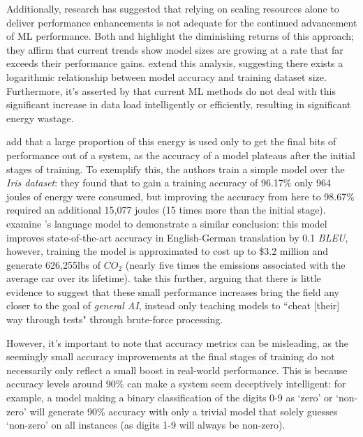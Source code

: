 \documentclass[a4paper, 12pt]{article}
\begin{document}
    Additionally, research has suggested that relying on scaling resources alone to deliver performance enhancements is not adequate for the continued advancement of ML performance. Both  and  highlight the diminishing returns of this approach; they affirm that current trends show model sizes are growing at a rate that far exceeds their performance gains.  extend this analysis, suggesting there exists a logarithmic relationship between model accuracy and training dataset size. Furthermore, it's asserted by  that current ML methods do not deal with this significant increase in data load intelligently or efficiently, resulting in significant energy wastage.

     add that a large proportion of this energy is used only to get the final bits of performance out of a system, as the accuracy of a model plateaus after the initial stages of training. To exemplify this, the authors train a simple model over the \emph{Iris dataset}: they found that to gain a training accuracy of 96.17\% only 964 joules of energy were consumed, but improving the accuracy from here to 98.67\% required an additional 15,077 joules (15 times more than the initial stage).  examine 's language model to demonstrate a similar conclusion: this model improves state-of-the-art accuracy in English-German translation by 0.1 \emph{BLEU}, however, training the model is approximated to cost up to \$3.2 million and generate 626,255lbs of $CO_2$ (nearly five times the emissions associated with the average car over its lifetime).  take this further, arguing that there is little evidence to suggest that these small performance increases bring the field any closer to the goal of \emph{general AI}, instead only teaching models to ``cheat [their] way through tests" through brute-force processing.

    However, it's important to note that accuracy metrics can be misleading, as the seemingly small accuracy improvements at the final stages of training do not necessarily only reflect a small boost in real-world performance. This is because accuracy levels around 90\% can make a system seem deceptively intelligent: for example, a model making a binary classification of the digits 0-9 as `zero' or `non-zero' will generate 90\% accuracy with only a trivial model that solely guesses `non-zero' on all instances (as digits 1-9 will always be non-zero).
\end{document}

